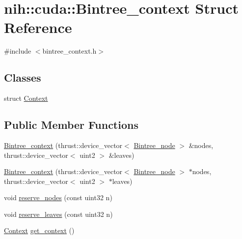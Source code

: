 \hypertarget{structnih_1_1cuda_1_1_bintree__context}{
\section{nih\-:\-:cuda\-:\-:\-Bintree\-\_\-context \-Struct \-Reference}
\label{structnih_1_1cuda_1_1_bintree__context}
}


{\ttfamily \#include $<$bintree\-\_\-context.\-h$>$}

\subsection*{\-Classes}
\begin{DoxyCompactItemize}
\item 
struct \hyperlink{structnih_1_1cuda_1_1_bintree__context_1_1_context}{\-Context}
\end{DoxyCompactItemize}
\subsection*{\-Public \-Member \-Functions}
\begin{DoxyCompactItemize}
\item 
\hyperlink{structnih_1_1cuda_1_1_bintree__context_a3e8d6b2383234b42c055a6c61d6d2b1d}{\-Bintree\-\_\-context} (thrust\-::device\-\_\-vector$<$ \hyperlink{structnih_1_1_bintree__node}{\-Bintree\-\_\-node} $>$ \&nodes, thrust\-::device\-\_\-vector$<$ uint2 $>$ \&leaves)
\item 
\hyperlink{structnih_1_1cuda_1_1_bintree__context_a8241779bf74ebdfd5af5802eac3a2561}{\-Bintree\-\_\-context} (thrust\-::device\-\_\-vector$<$ \hyperlink{structnih_1_1_bintree__node}{\-Bintree\-\_\-node} $>$ $\ast$nodes, thrust\-::device\-\_\-vector$<$ uint2 $>$ $\ast$leaves)
\item 
void \hyperlink{structnih_1_1cuda_1_1_bintree__context_ae887db1dc85b1157a9304d920604490b}{reserve\-\_\-nodes} (const uint32 n)
\item 
void \hyperlink{structnih_1_1cuda_1_1_bintree__context_a698f1637186d09ef776b18f54baa0cf9}{reserve\-\_\-leaves} (const uint32 n)
\item 
\hyperlink{structnih_1_1cuda_1_1_bintree__context_1_1_context}{\-Context} \hyperlink{structnih_1_1cuda_1_1_bintree__context_ac9366acf257d4869ff1925dbe7a40a85}{get\-\_\-context} ()
\end{DoxyCompactItemize}
